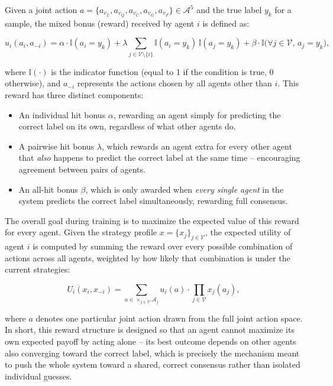 \documentclass[manuscript,review]{acmart}
\begin{document}
Given a joint action $a = \{a_{v_L}, a_{v_Q}, a_{v_C}, a_{v_G}, a_{v_F}\} \in
\mathcal{A}^5$ and the true label $y_k$ for a sample, the mixed bonus (reward) received
by agent $i$ is defined as:

\begin{equation}
u_i(a_i, a_{-i}) = \alpha \cdot \mathbb{I}(a_i = y_k)
+ \lambda \sum_{j \in \mathcal{V}\setminus\{i\}} \mathbb{I}(a_i = y_k)\,\mathbb{I}(a_j = y_k)
+ \beta \cdot \mathbb{I}\big(\forall j \in \mathcal{V},\, a_j = y_k\big),
\end{equation}

where $\mathbb{I}(\cdot)$ is the indicator function (equal to 1 if the condition is true,
0 otherwise), and $a_{-i}$ represents the actions chosen by all agents other than $i$.
This reward has three distinct components:

\begin{itemize}
    \item An individual hit bonus $\alpha$, rewarding an agent simply for predicting the
    correct label on its own, regardless of what other agents do.
    \item A pairwise hit bonus $\lambda$, which rewards an agent extra for every other
    agent that \emph{also} happens to predict the correct label at the same time --
    encouraging agreement between pairs of agents.
    \item An all-hit bonus $\beta$, which is only awarded when \emph{every single agent}
    in the system predicts the correct label simultaneously, rewarding full consensus.
\end{itemize}

The overall goal during training is to maximize the expected value of this reward for
every agent. Given the strategy profile $x = \{x_j\}_{j \in \mathcal{V}}$, the expected
utility of agent $i$ is computed by summing the reward over every possible combination of
actions across all agents, weighted by how likely that combination is under the current
strategies:

\begin{equation}
U_i(x_i, x_{-i}) = \sum_{a \in \times_{j \in \mathcal{V}} \mathcal{A}_j} u_i(a) \cdot \prod_{j \in \mathcal{V}} x_j(a_j),
\end{equation}

where $a$ denotes one particular joint action drawn from the full joint action space. In
short, this reward structure is designed so that an agent cannot maximize its own expected
payoff by acting alone -- its best outcome depends on other agents also converging toward
the correct label, which is precisely the mechanism meant to push the whole system toward
a shared, correct consensus rather than isolated individual guesses.
\end{document}
